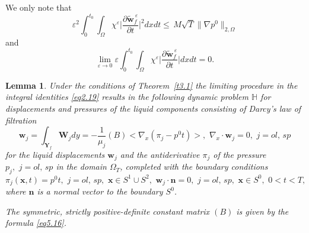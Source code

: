\documentclass{article}
\theoremstyle{plain}
\newtheorem{lemma}[theorem]{Lemma}
\theoremstyle{definition}
\numberwithin{equation}{section}
\begin{document}
We only note that
\begin{equation*}
\varepsilon^{2}\int_{0}^{t_{0}}\int_{\Omega}\chi^{\varepsilon}
\Big|\frac{\partial\widetilde{\boldsymbol{w}}^{\,\varepsilon}_{f}}{\partial{t}}\Big|^{2}dxdt
\leqslant\,{M}\sqrt{T}\|\nabla{p}^{0}\|_{2,\Omega}
\end{equation*}
and
\begin{equation*}
\lim_{\varepsilon\rightarrow{0}}\varepsilon\int_{0}^{t_{0}}\int_{\Omega}\chi^{\varepsilon}
\Big|\frac{\partial\widetilde{\boldsymbol{w}}^{\,\varepsilon}_{f}}{\partial{t}}\Big|dxdt=0.
\end{equation*}

\begin{lemma}\label{l5.3}
Under the conditions of Theorem~\ref{t3.1} the limiting procedure in the integral identities \eqref{eq2.19} results in the following dynamic problem $\mathbb{H}$ for displacements and pressures of the liquid components consisting of Darcy's law of filtration
\begin{equation}\label{eq5.3}
\boldsymbol{w}_{j}=\int_{\textbf{Y}_{f}}\boldsymbol{W}_{j}dy=
-\frac{1}{\mu_{j}}(B)<\nabla_{x}({\pi}_{j}-{p}^{0}t)>,\,\,
\nabla_{x}\cdot\boldsymbol{w}_{j}=0,\,\,j=ol,\,sp
\end{equation}
for the liquid displacements $\boldsymbol{w}_{j}$ and the antiderivative ${\pi}_{j}$ of the pressure ${p}_{j},\,\,j=ol,\,sp$ in the domain $\Omega_{T}$, completed with the boundary conditions
\begin{equation}\label{eq5.4}
{\pi}_{j}(\boldsymbol{x},t)={p}^{0}t,\,\,j=ol,\,sp,\,\,\boldsymbol{x}\in{S}^{1}\cup{S}^{2},\,\,
\boldsymbol{w}_{j}\cdot\boldsymbol{n}=0,\,\,j=ol,\,sp,\,\,\boldsymbol{x}\in{S}^{0},\,\,0<t<T,
\end{equation}
where $\boldsymbol{n}$ is a normal vector to the boundary ${S}^{0}$.

The symmetric, strictly positive-definite constant matrix $(B)$ is given by the formula \eqref{eq5.16}.
\end{lemma}
\end{document}
